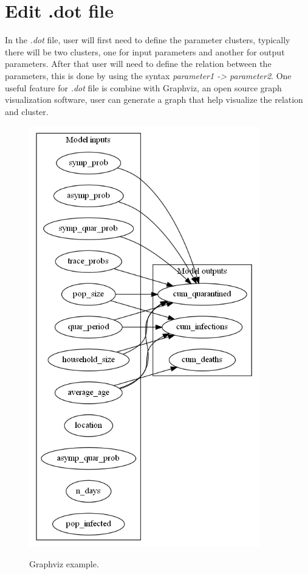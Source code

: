 \section{Edit .dot file}
In the \textsl{.dot} file, user will first need to define the parameter clusters, typically there will be two clusters, one for input parameters and another for output parameters. After that user will need to define the relation between the parameters, this is done by using the syntax \textsl{ parameter1 -> parameter2}. One useful feature for \textsl{.dot} file is combine with Graphviz, an open source graph visualization software, user can generate a graph that help visualize the relation and cluster. 
\begin{figure}[H]
	\centering
	\includegraphics[width=10cm]{figures/dotExample.png}\\
	\caption{Graphviz example.}
	\label{fig:figure13}
\end{figure}
